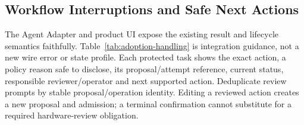 \subsection{Workflow Interruptions and Safe Next Actions}
\label{sec:adoption-workflow}

The Agent Adapter and product UI expose the existing result and lifecycle
semantics faithfully. Table~\ref{tab:adoption-handling} is integration guidance,
not a new wire error or state profile. Each protected task shows the exact
action, a policy reason safe to disclose, its proposal/attempt reference,
current status, responsible reviewer/operator and next supported action.
Deduplicate review prompts by stable proposal/operation identity. Editing a
reviewed action creates a new proposal and admission; a terminal confirmation
cannot substitute for a required hardware-review obligation.


